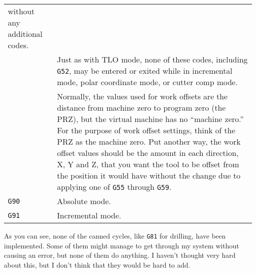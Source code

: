 \documentclass[titlepage,oneside,10pt]{article}
\begin{document}
\begin{longtable}{lp{10cm}}
without any additional codes.\\
&Just as with TLO mode, none of these codes, including {\tt G52}, may be
entered or exited while in incremental mode, polar coordinate mode, or
cutter comp mode.\\
&Normally, the values used for work offsets are the distance from
machine zero to program zero (the PRZ), but the virtual machine has no
``machine zero.'' For the purpose of work offset settings, think of
the PRZ as the machine zero. Put another way, the work offset values
should be the amount in each direction, X, Y and Z, that you want the
tool to be offset from the position it would have without the change
due to applying one of {\tt G55} through {\tt G59}.\\
{\tt G90}&Absolute mode.\\
{\tt G91}&Incremental mode.
\end{longtable}
\vskip 0.50cm
As you can see, none of the canned cycles, like {\tt G81} for
drilling, have been implemented. Some of them might manage to get
through my system without causing an error, but none of them do
anything. I haven't thought very hard about this, but I don't think that
they would be hard to add.
\end{document}
